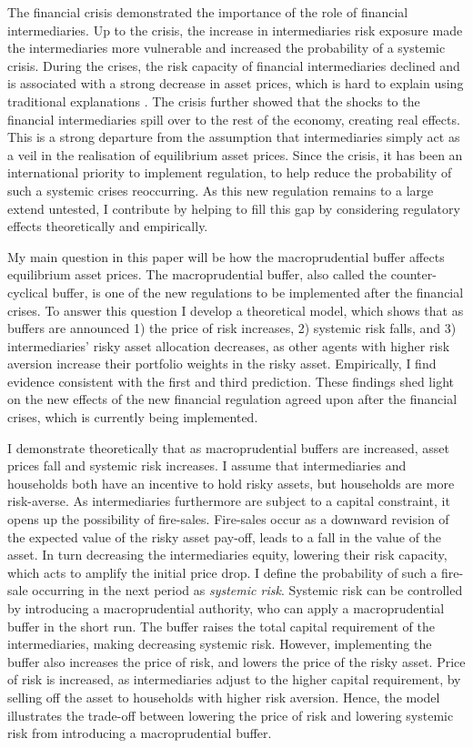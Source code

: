 \documentclass[11pt]{article}
\begin{document}
The financial crisis demonstrated the importance of the role of financial intermediaries. Up to the crisis, the increase in intermediaries risk exposure made the intermediaries more vulnerable and increased the probability of a systemic crisis. During the crises, the risk capacity of financial intermediaries declined and is associated with a strong decrease in asset prices, which is hard to explain using traditional explanations \citep*{He2013, Adrian2014, Brunnermeier2014}. The crisis further showed that the shocks to the financial intermediaries spill over to the rest of the economy, creating real effects.
This is a strong departure from the assumption that intermediaries simply act as a veil in the realisation of equilibrium asset prices. 
Since the crisis, it has been an international priority to implement regulation, to help reduce the probability of such a systemic crises reoccurring. As this new regulation remains to a large extend untested, I contribute by helping to fill this gap by considering regulatory effects theoretically and empirically.

My main question in this paper will be how the macroprudential buffer affects equilibrium asset prices. The macroprudential buffer, also called the counter-cyclical buffer, is one of the new regulations to be implemented after the financial crises. To answer this question I develop a theoretical model, which shows that as buffers are announced 1) the price of risk increases, 2) systemic risk falls, and 3) intermediaries' risky asset allocation decreases, as other agents with higher risk aversion increase their portfolio weights in the risky asset.
Empirically, I find evidence consistent with the first and third prediction. These findings shed light on the new effects of the new financial regulation agreed upon after the financial crises, which is currently being implemented.


I demonstrate theoretically that as macroprudential buffers are increased, asset prices fall and systemic risk increases. I assume that intermediaries and households both have an incentive to hold risky assets, but households are more risk-averse. As intermediaries furthermore are subject to a capital constraint, it opens up the possibility of fire-sales. Fire-sales occur as a downward revision of the expected value of the risky asset pay-off, leads to a fall in the value of the asset. In turn decreasing the intermediaries equity, lowering their risk capacity, which acts to amplify the initial price drop. I define the probability of such a fire-sale occurring in the next period as \emph{systemic risk}. Systemic risk can be controlled by introducing a macroprudential authority, who can apply a macroprudential buffer in the short run. The buffer raises the total capital requirement of the intermediaries, making decreasing systemic risk. However, implementing the buffer also increases the price of risk, and lowers the price of the risky asset. Price of risk is increased, as intermediaries adjust to the higher capital requirement, by selling off the asset to households with higher risk aversion. Hence, the model illustrates the trade-off between lowering the price of risk and lowering systemic risk from introducing a macroprudential buffer.
 
\end{document}
